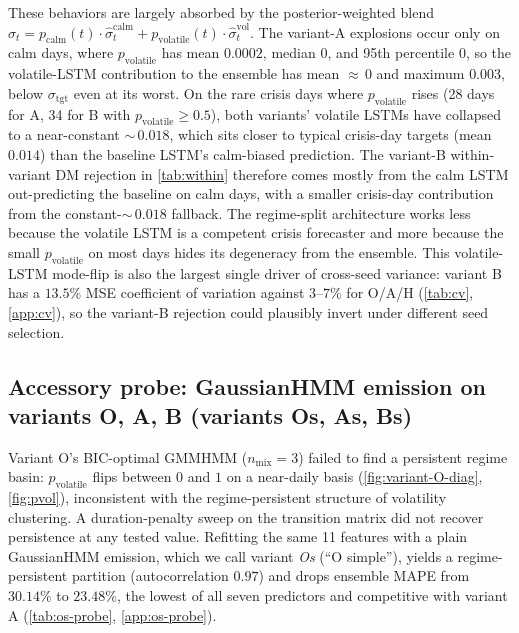 \documentclass{article}
\begin{document}
These behaviors are largely absorbed by the posterior-weighted blend $\hat\sigma_t = p_{\mathrm{calm}}(t) \cdot \hat\sigma^{\mathrm{calm}}_t + p_{\mathrm{volatile}}(t) \cdot \hat\sigma^{\mathrm{vol}}_t$. The variant-A explosions occur only on calm days, where $p_{\mathrm{volatile}}$ has mean $0.0002$, median $0$, and 95th percentile $0$, so the volatile-LSTM contribution to the ensemble has mean ${\approx}\,0$ and maximum $0.003$, below $\sigma_{\mathrm{tgt}}$ even at its worst. On the rare crisis days where $p_{\mathrm{volatile}}$ rises (28 days for A, 34 for B with $p_{\mathrm{volatile}} \geq 0.5$), both variants' volatile LSTMs have collapsed to a near-constant ${\sim}\,0.018$, which sits closer to typical crisis-day targets (mean $0.014$) than the baseline LSTM's calm-biased prediction. The variant-B within-variant DM rejection in \cref{tab:within} therefore comes mostly from the calm LSTM out-predicting the baseline on calm days, with a smaller crisis-day contribution from the constant-${\sim}\,0.018$ fallback. The regime-split architecture works less because the volatile LSTM is a competent crisis forecaster and more because the small $p_{\mathrm{volatile}}$ on most days hides its degeneracy from the ensemble. This volatile-LSTM mode-flip is also the largest single driver of cross-seed variance: variant B has a $13.5\%$ MSE coefficient of variation against $3$--$7\%$ for O/A/H (\cref{tab:cv}, \cref{app:cv}), so the variant-B rejection could plausibly invert under different seed selection.

\subsection{Accessory probe: GaussianHMM emission on variants O, A, B (variants Os, As, Bs)}
\label{sec:os-discovery}

Variant O's BIC-optimal GMMHMM ($n_{\mathrm{mix}}=3$) failed to find a persistent regime basin: $p_{\mathrm{volatile}}$ flips between $0$ and $1$ on a near-daily basis (\cref{fig:variant-O-diag}, \cref{fig:pvol}), inconsistent with the regime-persistent structure of volatility clustering. A duration-penalty sweep on the transition matrix did not recover persistence at any tested value. Refitting the same 11 features with a plain GaussianHMM emission, which we call variant \emph{Os} (``O simple''), yields a regime-persistent partition (autocorrelation $0.97$) and drops ensemble MAPE from $30.14\%$ to $23.48\%$, the lowest of all seven predictors and competitive with variant A (\cref{tab:os-probe}, \cref{app:os-probe}).
\end{document}
